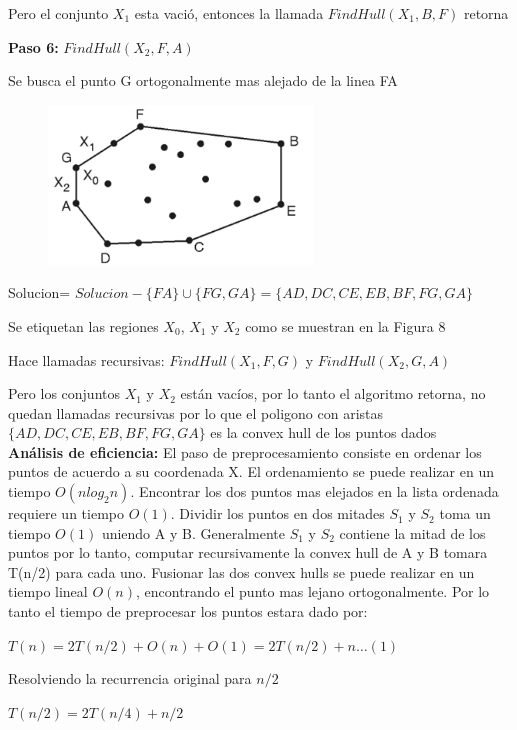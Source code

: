\begin{enumerate}[a)]
Pero el conjunto $X_1$ esta vació, entonces la llamada $FindHull(X_1, B, F)$ retorna

\textbf{Paso 6: }$FindHull(X_2, F, A)$

Se busca el punto G ortogonalmente mas alejado de la linea FA

\begin{figure}[!htb]
  \centering
  \includegraphics[width=7cm, scale=1]{Images/Punto3/ej7.png}
  \caption{}
\end{figure}

Solucion= $Solucion - \{FA\} \cup \{FG,GA\} = \{AD, DC, CE, EB, BF, FG, GA\}$

Se etiquetan las regiones $X_0$, $X_1$ y $X_2$ como se muestran en la Figura 8

Hace llamadas recursivas: $FindHull(X_1, F, G)$ y $FindHull(X_2, G, A)$

Pero los conjuntos $X_1$ y $X_2$ están vacíos, por lo tanto el algoritmo retorna, no quedan llamadas recursivas por lo que el poligono con aristas $\{AD, DC, CE, EB, BF, FG, GA\}$ es la convex hull de los puntos dados\\

\textbf{Análisis de eficiencia: }El paso de preprocesamiento consiste en ordenar los puntos de acuerdo a su coordenada X. El ordenamiento se puede realizar en un tiempo $O(nlog_2n)$. Encontrar los dos puntos mas elejados en la lista ordenada requiere un tiempo $O(1)$. Dividir los puntos en dos mitades $S_1$ y $S_2$ toma un tiempo $O(1)$ uniendo A y B. Generalmente $S_1$ y $S_2$ contiene la mitad de los puntos por lo tanto, computar recursivamente la convex hull de A y B tomara T(n/2) para cada uno. Fusionar las dos convex hulls se puede realizar en un tiempo lineal $O(n)$, encontrando el punto mas lejano ortogonalmente. Por lo tanto el tiempo de preprocesar los puntos estara dado por:

$T(n)=2T(n/2) + O(n) + O(1) = 2T(n/2)+ n \ldots (1)$

Resolviendo la recurrencia original para $n/2$

$T(n/2) = 2T(n/4) + n/2$


\end{enumerate}
